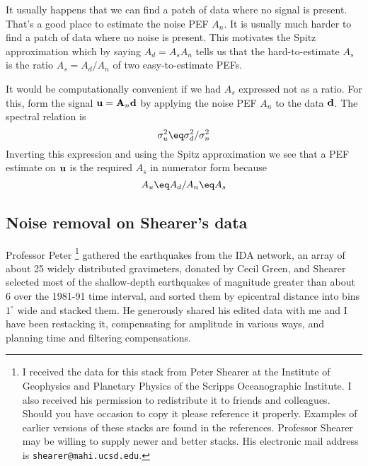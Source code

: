 \par
It usually happens that we can
find a patch of data where no signal is present.
That's a good place to estimate the noise PEF $A_n$.
It is usually much harder to find a patch of data where no noise is present.
This motivates the Spitz approximation which by saying
$ A_d = A_s  A_n $
tells us that the hard-to-estimate $A_s$ is the ratio
$ A_s = A_d /  A_n $
of two easy-to-estimate PEFs.

\par
It would be computationally convenient if
we had $A_s$ expressed not as a ratio.
For this, form the signal
$\bold u = \bold A_n \bold d$
by applying the noise PEF $A_n$ to the data $\bold d$.
The spectral relation is
\begin{equation}
\sigma_u^2 \eq 
\sigma_d^2 /
\sigma_n^2
\end{equation}
Inverting this expression
and using the Spitz approximation
we see that
a PEF estimate on $\bold u$ is the required $A_s$ in numerator form because
\begin{equation}
A_u \eq A_d / A_n \eq A_s
\end{equation}







\subsection{Noise removal on Shearer's data}
Professor Peter \footnote{
        I received the data for this stack from Peter Shearer
        at the  Institute of Geophysics
        and Planetary Physics of the Scripps Oceanographic Institute.
        I also received his permission to redistribute it
        to friends and colleagues.
        Should you have occasion to copy it please reference
        \cite{Shearer.jgr.91.18147} \cite{Shearer.jgr.91.20535}
        it properly.
        Examples of earlier versions of these stacks
        are found in the references.
        Professor Shearer may be willing to supply newer and better stacks.
        His electronic mail address is {\tt shearer@mahi.ucsd.edu}.
        }
gathered the earthquakes from the IDA network,
an array of about 25 widely distributed gravimeters,
donated by Cecil Green,
and Shearer selected most of the shallow-depth earthquakes
of magnitude greater than about 6 over the 1981-91 time interval,
and sorted them by epicentral distance into bins $1^\circ$ wide
and stacked them.
He generously shared his edited data with me
and I have been restacking it,
compensating for amplitude in various ways,
and planning time and filtering compensations.

